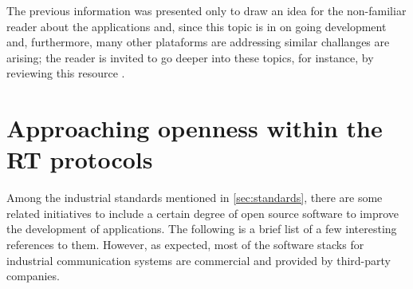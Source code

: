 The previous information was presented only to draw an idea for the non-familiar reader about the applications and, since this topic is in on going development 
and, furthermore, many other plataforms are addressing similar challanges are arising; the reader is invited
to go deeper into these topics, for instance, by reviewing this resource \cite{middleware_industrial}. %

\section{Approaching openness within the RT protocols}\label{sec:openness}

Among the industrial standards mentioned in \ref{sec:standards}, there are some related initiatives to include a certain degree of open source
software to improve the development of applications. The following is a brief list of a few interesting references to them. 
However, as expected, most of the software stacks
for industrial communication systems are commercial and provided by third-party companies. 

